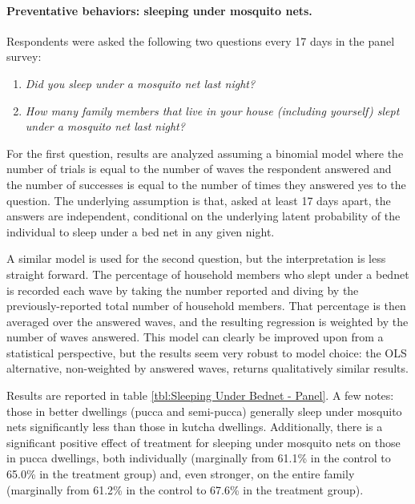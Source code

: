 \documentclass[a4paper,12pt]{article}
\begin{document}
\paragraph{Preventative behaviors: sleeping under mosquito nets.} Respondents were asked the following two questions every 17 days in the panel survey:

\begin{enumerate}
\item \textit{Did you sleep under a mosquito net last night?}
\item \textit{How many family members that live in your house (including yourself) slept under a mosquito net last night?}
\end{enumerate}

For the first question, results are analyzed assuming a binomial model where the number of trials is equal to the number of waves the respondent answered and the number of successes is equal to the number of times they answered yes to the question. The underlying assumption is that, asked at least 17 days apart, the answers are independent, conditional on the underlying latent probability of the individual to sleep under a bed net in any given night.

A similar model is used for the second question, but the interpretation is less straight forward. The percentage of household members who slept under a bednet is recorded each wave by taking the number reported and diving by the previously-reported total number of household members. That percentage is then averaged over the answered waves, and the resulting regression is weighted by the number of waves answered. This model can clearly be improved upon from a statistical perspective, but the results seem very robust to model choice: the OLS alternative, non-weighted by answered waves, returns qualitatively similar results.


Results are reported in table \ref{tbl:Sleeping Under Bednet - Panel}. A few notes: those in better dwellings (pucca and semi-pucca) generally sleep under mosquito nets significantly less than those in kutcha dwellings. Additionally, there is a significant positive effect of treatment for sleeping under mosquito nets on those in pucca dwellings, both individually (marginally from 61.1\% in the control to 65.0\% in the treatment group) and, even stronger, on the entire family (marginally from 61.2\% in the control to 67.6\% in the treatment group).



\end{document}
